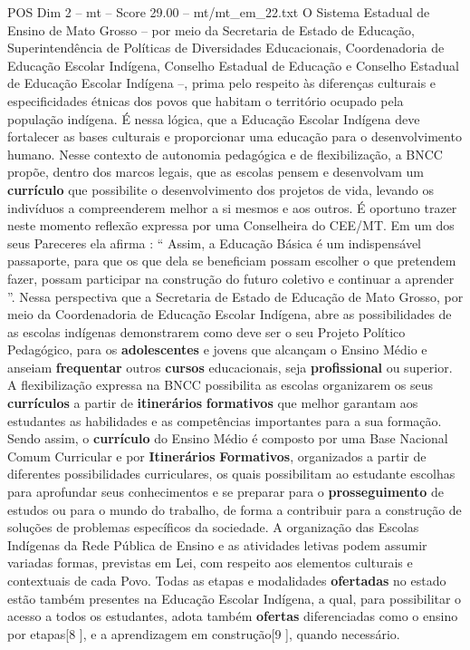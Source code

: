 \begin{textsample}{POS Dim 2 – mt – Score 29.00 – mt/mt\_em\_22.txt}
O Sistema Estadual de Ensino de Mato Grosso – por meio da Secretaria de Estado de Educação, Superintendência de Políticas de Diversidades Educacionais, Coordenadoria de Educação Escolar Indígena, Conselho Estadual de Educação e Conselho Estadual de Educação Escolar Indígena –, prima pelo respeito às diferenças culturais e especificidades étnicas dos povos que habitam o território ocupado pela população indígena.
É nessa lógica, que a Educação Escolar Indígena deve fortalecer as bases culturais e proporcionar uma educação para o desenvolvimento humano.
Nesse contexto de autonomia pedagógica e de flexibilização, a BNCC propõe, dentro dos marcos legais, que as escolas pensem e desenvolvam um \textbf{currículo} que possibilite o desenvolvimento dos projetos de vida, levando os indivíduos a compreenderem melhor a si mesmos e aos outros.
É oportuno trazer neste momento reflexão expressa por uma Conselheira do CEE/MT.
Em um dos seus Pareceres ela afirma : “ Assim, a Educação Básica é um indispensável passaporte, para que os que dela se beneficiam possam escolher o que pretendem fazer, possam participar na construção do futuro coletivo e continuar a aprender ”.
Nessa perspectiva que a Secretaria de Estado de Educação de Mato Grosso, por meio da Coordenadoria de Educação Escolar Indígena, abre as possibilidades de as escolas indígenas demonstrarem como deve ser o seu Projeto Político Pedagógico, para os \textbf{adolescentes} e jovens que alcançam o Ensino Médio e anseiam \textbf{frequentar} outros \textbf{cursos} educacionais, seja \textbf{profissional} ou superior.
A flexibilização expressa na BNCC possibilita as escolas organizarem os seus \textbf{currículos} a partir de \textbf{itinerários} \textbf{formativos} que melhor garantam aos estudantes as habilidades e as competências importantes para a sua formação.
Sendo assim, o \textbf{currículo} do Ensino Médio é composto por uma Base Nacional Comum Curricular e por \textbf{Itinerários} \textbf{Formativos}, organizados a partir de diferentes possibilidades curriculares, os quais possibilitam ao estudante escolhas para aprofundar seus conhecimentos e se preparar para o \textbf{prosseguimento} de estudos ou para o mundo do trabalho, de forma a contribuir para a construção de soluções de problemas específicos da sociedade.
A organização das Escolas Indígenas da Rede Pública de Ensino e as atividades letivas podem assumir variadas formas, previstas em Lei, com respeito aos elementos culturais e contextuais de cada Povo.
Todas as etapas e modalidades \textbf{ofertadas} no estado estão também presentes na Educação Escolar Indígena, a qual, para possibilitar o acesso a todos os estudantes, adota também \textbf{ofertas} diferenciadas como o ensino por etapas[8 ], e a aprendizagem em construção[9 ], quando necessário.

\end{textsample}
